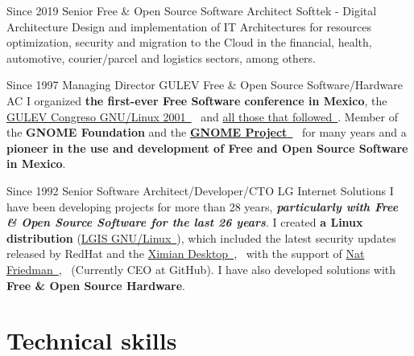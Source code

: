 \documentclass[]{friggeri-cv}
\begin{document}
\begin{entrylist}
    \entry%
    {Since 2019}
    {Senior Free \& Open Source Software Architect}
    {Softtek - Digital Architecture}
    {Design and implementation of IT Architectures for resources optimization, security and migration to the Cloud in the financial, health, automotive, courier/parcel and logistics sectors, among others.}
\end{entrylist}

\begin{entrylist}
    \entry%
    {Since 1997}
    {Managing Director}
    {GULEV Free \& Open Source Software/Hardware AC}
    {I organized \textbf{the first-ever Free Software conference in Mexico}, the \href{http://gulev.org.mx/eventos/gulev2001}{GULEV Congreso GNU/Linux 2001~{\nfURL}}~ and \href{http://gulev.org.mx/conferences}{all those that followed~{\nfURL}}. Member of the \textbf{GNOME Foundation} and the \href{https://www.gnome.org/}{\textbf{GNOME Project}~{\nfURL}}~ for many years and a \textbf{pioneer in the use and development of Free and Open Source Software in Mexico}. }
\end{entrylist}

\begin{entrylist}
    \entry%
    {Since 1992}
    {Senior Software Architect/Developer/CTO}
    {LG Internet Solutions}
    {I have been developing projects for more than 28 years, \textbf{\textit{particularly with Free \& Open Source Software for the last 26 years}}. I created \textbf{a Linux distribution} (\href{https://distrowatch.com/table.php?distribution=lgis}{LGIS GNU/Linux~{\nfURL}}), which included the latest security updates released by RedHat and the \href{https://en.wikipedia.org/wiki/Ximian}{Ximian Desktop~{\nfURL}},~ with the support of \href{https://www.linkedin.com/in/natfriedman/}{Nat Friedman~{\nfURL}},~ (Currently CEO at GitHub). I have also developed solutions with \textbf{Free \& Open Source Hardware}.}
\end{entrylist}

\section{Technical skills}
\end{document}
